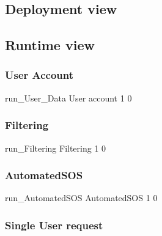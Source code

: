 \documentclass[../DD0.tex]{subfiles}
\begin{document}
  \subsection{Deployment view}
  \label{sec:deplview}

\clearpage

  \subsection{Runtime view}
  \label{sec:runtview}
\subsubsection{User Account}

\label{sec:useracc}

    \fetchUML
      {run_User_Data}
      {User account}
      {1}           %
      {0}           %

  \clearpage



\subsubsection{Filtering}

\label{sec:useracc}

    \fetchUML
      {run_Filtering}
      {Filtering}
      {1}           %
      {0}           %

  \clearpage

\subsubsection{AutomatedSOS}

\label{sec:useracc}

    \fetchUML
      {run_AutomatedSOS}
      {AutomatedSOS}
      {1}           %
      {0}           %

  \clearpage

\subsubsection{Single User request}

\label{sec:useracc}
\end{document}
